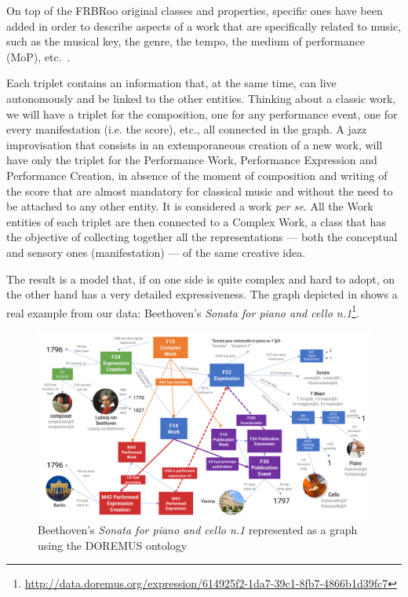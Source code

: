 On top of the FRBRoo original classes and properties, specific ones have been added in order to describe aspects of a work that are specifically related to music, such as the musical key, the genre, the tempo, the medium of performance (MoP), etc.~\cite{choffe2016doremus}.

Each triplet contains an information that, at the same time, can live autonomously and be linked to the other entities. Thinking about a classic work, we will have a triplet for the composition, one for any performance event, one for every manifestation (i.e. the score), etc., all connected in the graph. A jazz improvisation that consists in an extemporaneous creation of a new work, will have only the triplet for the Performance Work, Performance Expression and Performance Creation, in absence of the moment of composition and writing of the score that are almost mandatory for classical music and without the need to be attached to any other entity. It is considered a work \textit{per se}. All the Work entities of each triplet are then connected to a Complex Work, a class that has the objective of collecting together all the representations --- both the conceptual and sensory ones (manifestation) --- of the same creative idea.

The result is a model that, if on one side is quite complex and hard to adopt, on the other hand has a very detailed expressiveness. The graph depicted in shows a real example from our data: Beethoven's \textit{Sonata for piano and cello n.1}\footnote{\url{http://data.doremus.org/expression/614925f2-1da7-39c1-8fb7-4866b1d39fc7}}.

\begin{figure}
 \centerline{
 \includegraphics[width=\textwidth]{figs/schema_2.png}}
 \caption{Beethoven's \textit{Sonata for piano and cello n.1} represented as a graph using the DOREMUS ontology}
 \label{fig:schema}
\end{figure}

